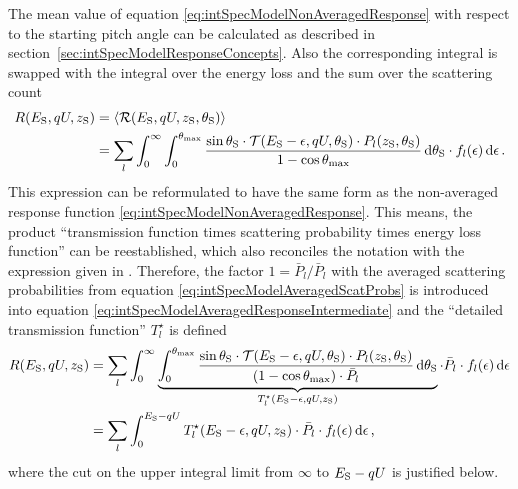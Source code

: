 The mean value of equation \eqref{eq:intSpecModelNonAveragedResponse} with respect to the starting pitch angle can be calculated as described in section~\ref{sec:intSpecModelResponseConcepts}. Also the corresponding integral is swapped with the integral over the energy loss and the sum over the scattering count
\begin{align}
\label{eq:intSpecModelAveragedResponseIntermediate}
R(E_\mathrm{S}, qU, z_\mathrm{S}) &= 
\left\langle{\mathcal{R}(E_\mathrm{S}, qU, z_\mathrm{S}, \theta_\mathrm{S})}\right\rangle \nonumber\\ &=
\sum_{l}
	\int_{0}^{\infty}
	\int_{0}^{\theta_\mathrm{max}}
		\frac{
			\sin\theta_\mathrm{S} \cdot
			\mathcal{T}(E_\mathrm{S}-\epsilon, qU, \theta_\mathrm{S}) \cdot P_l(z_\mathrm{S}, \theta_\mathrm{S})
		}{
			1-\cos\theta_\mathrm{max}
		}
	\mathop{}\!\mathrm{d} \theta_\mathrm{S}
	\cdot f_l(\epsilon)
	\mathop{}\!\mathrm{d} \epsilon
\text{\,.}
\end{align}
This expression can be reformulated to have the same form as the non-averaged response function \eqref{eq:intSpecModelNonAveragedResponse}. This means, the product ``transmission function times scattering probability times energy loss function'' can be reestablished, which also reconciles the notation  with the expression given in \cite{Groh2015}. Therefore, the factor $1=\bar{P}_l/\bar{P}_l$ with the averaged scattering probabilities from equation \eqref{eq:intSpecModelAveragedScatProbs} is introduced into equation \eqref{eq:intSpecModelAveragedResponseIntermediate} and the ``detailed transmission function'' $T_l^{\star}$ is defined
\begin{align}
	R(E_\mathrm{S}, qU, z_\mathrm{S}) &=
	\sum_{l}
	\int_{0}^{\infty}
	\underbrace{
		\int_{0}^{\theta_\mathrm{max}}
		\frac{
			\sin\theta_\mathrm{S} \cdot
			\mathcal{T}(E_\mathrm{S}-\epsilon, qU, \theta_\mathrm{S}) \cdot P_l(z_\mathrm{S}, \theta_\mathrm{S})
		}{
			(1-\cos\theta_\mathrm{max}) \cdot \bar{P}_l \vphantom{\large A}
		}
		\mathop{}\!\mathrm{d} \theta_\mathrm{S}
	}_{
		T_l^{\star}(E_\mathrm{S}-\epsilon,qU,z_\mathrm{S})
	}
	\cdot \bar{P}_l \cdot f_l(\epsilon)
	\mathop{}\!\mathrm{d} \epsilon \nonumber \\ &=
	\label{eq:intSpecModelFullResponseIntermediate}
	\sum_{l}
	\int_{0}^{E_\mathrm{S}-qU}
	T_l^{\star}(E_\mathrm{S}-\epsilon,qU,z_\mathrm{S})
	\cdot \bar{P}_l \cdot f_l(\epsilon)
	\mathop{}\!\mathrm{d} \epsilon
	\text{\,,}
\end{align}
where the cut on the upper integral limit from $\infty$ to $E_\mathrm{S}-qU$ is justified below.

